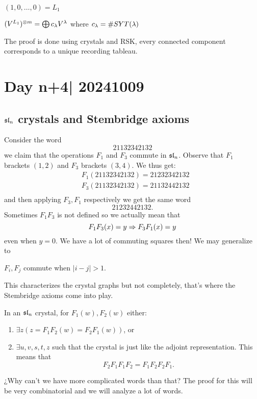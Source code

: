 \documentclass[12pt]{memoir}
\begin{document}
$(1,0,\dots,0)=L_1$

\begin{Th}
    $(V^{L_1})^{\otimes m}=\bigoplus c_\lambda V^{\lambda}$
    where $c_\lambda=\#SYT(\lambda)$
\end{Th}

The proof is done using crystals and RSK, every connected component corresponds to a unique recording tableau.

\section{Day n+4| 20241009}

\subsection{$\mathfrak{sl}_n$ crystals and Stembridge axioms}

Consider the word 
$$21132342132$$
we claim that the operations $F_1$ and $F_3$ commute in $\mathfrak{sl}_n$. Observe that $F_1$ brackets $(1,2)$ and $F_3$ brackets $(3,4)$. 
We thus get:
\begin{align*}
    &F_1(21132342132)=21232342132\\
    &F_3(21132342132)=21132442132\\
\end{align*} 
and then applying $F_3,F_1$ respectively we get the same word 
$$21232442132.$$
Sometimes $F_1F_3$ is not defined so we actually mean that 
$$F_1F_3(x)=y\Rightarrow F_3F_1(x)=y$$
even when $y=0$. We have a lot of commuting squares then! We may generalize to 

\begin{Th}
    $F_i,F_j$ commute when $|i-j|>1$. 
\end{Th}

This characterizes the crystal graphs but not completely, that's where the Stembridge axioms come into play. 

\begin{Th}
    In an $\mathfrak{sl}_n$ crystal, for $F_1(w),F_2(w)$ either:
    \begin{enumerate}
        \item $\exists z (z=F_1F_2(w)=F_2F_1(w))$, or
        \item $\exists u,v,s,t,z$ such that the crystal is just like the adjoint representation. This means that 
        $$F_2F_1F_1F_2=F_1F_2F_2F_1.$$
    \end{enumerate}
\end{Th}

¿Why can't we have more complicated words than that? The proof for this will be very combinatorial and we will analyze a lot of words.
\end{document}
